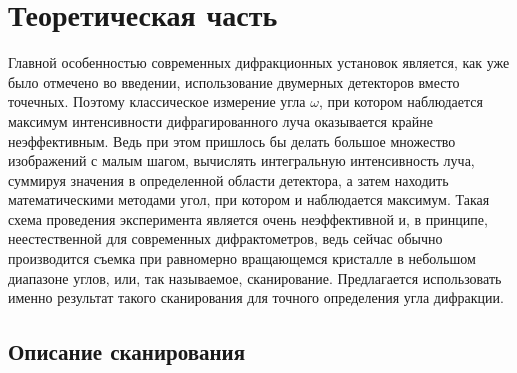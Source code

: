 \section{Теоретическая часть}

Главной особенностью современных дифракционных установок является, как уже было отмечено во введении, использование двумерных детекторов вместо точечных.
Поэтому классическое измерение угла $\omega$, при котором наблюдается максимум интенсивности дифрагированного луча оказывается крайне неэффективным.
Ведь при этом пришлось бы делать большое множество изображений с малым шагом, вычислять интегральную интенсивность луча, суммируя значения в определенной области детектора, а затем находить математическими методами угол, при котором и наблюдается максимум.
Такая схема проведения эксперимента является очень неэффективной и, в принципе, неестественной для современных дифрактометров, ведь сейчас обычно производится съемка при равномерно вращающемся кристалле в небольшом диапазоне углов, или, так называемое, сканирование.
Предлагается использовать именно результат такого сканирования для точного определения угла дифракции.

\subsection{Описание сканирования}

